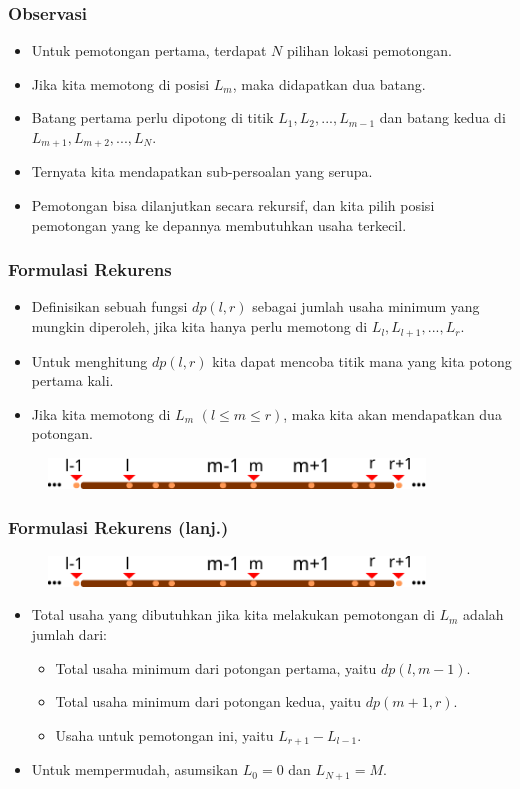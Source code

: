 \begin{frame}
\frametitle{Observasi}
\begin{itemize}
  \item Untuk pemotongan pertama, terdapat $N$ pilihan lokasi pemotongan.
  \item Jika kita memotong di posisi $L_m$, maka didapatkan dua batang.
  \item Batang pertama perlu dipotong di titik $L_1, L_2, ..., L_{m-1}$ dan batang kedua di $L_{m+1}, L_{m+2}, ..., L_N$.
  \item Ternyata kita mendapatkan sub-persoalan yang serupa.
  \item Pemotongan bisa dilanjutkan secara rekursif, dan kita pilih posisi pemotongan yang ke depannya membutuhkan usaha terkecil.
\end{itemize}
\end{frame}

\begin{frame}
\frametitle{Formulasi Rekurens}
\begin{itemize}
  \item Definisikan sebuah fungsi $dp(l,r)$ sebagai jumlah usaha minimum yang mungkin diperoleh, jika kita hanya perlu memotong di $L_{l}, L_{l+1}, ..., L_{r}$.
  \item Untuk menghitung $dp(l,r)$ kita dapat mencoba titik mana yang kita potong pertama kali.
  \item Jika kita memotong di $L_m$ $(l \leq m \leq r)$, maka kita akan mendapatkan dua potongan.
\end{itemize}
\begin{figure}
  \includegraphics[width=10cm]{asset/cutting-stick-4.pdf}
\end{figure}
\end{frame}

\begin{frame}
\frametitle{Formulasi Rekurens (lanj.)}
\begin{figure}
  \includegraphics[width=10cm]{asset/cutting-stick-4.pdf}
\end{figure}
\begin{itemize}
  \item Total usaha yang dibutuhkan jika kita melakukan pemotongan di $L_m$ adalah jumlah dari:
  \begin{itemize}
    \item Total usaha minimum dari potongan pertama, yaitu $dp(l,m-1)$.
    \item Total usaha minimum dari potongan kedua, yaitu $dp(m+1,r)$.
    \item Usaha untuk pemotongan ini, yaitu $L_{r+1} - L_{l-1}$.
  \end{itemize}
  \item Untuk mempermudah, asumsikan $L_0 = 0$ dan $L_{N+1} = M$.
\end{itemize}
\end{frame}

